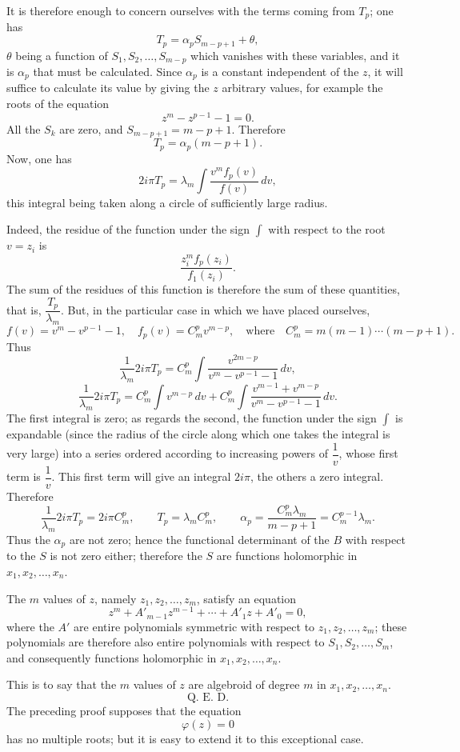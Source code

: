 \documentclass[11pt]{article}
\begin{document}
It is therefore enough to concern ourselves with the terms coming from $T_p$; one has
\[
T_p=\alpha_p S_{m-p+1}+\theta,
\]
$\theta$ being a function of $S_1,S_2,\ldots,S_{m-p}$ which vanishes with these variables, and it is $\alpha_p$ that must be calculated. Since $\alpha_p$ is a constant independent of the $z$, it will suffice to calculate its value by giving the $z$ arbitrary values, for example the roots of the equation
\[
z^m-z^{p-1}-1=0.
\]
All the $S_k$ are zero, and $S_{m-p+1}=m-p+1$. Therefore
\[
T_p=\alpha_p(m-p+1).
\]
Now, one has
\[
2i\pi T_p=\lambda_m\int \frac{v^m f_p(v)}{f(v)}\,dv,
\]
this integral being taken along a circle of sufficiently large radius.

Indeed, the residue of the function under the sign $\int$ with respect to the root $v=z_i$ is
\[
\frac{z_i^m f_p(z_i)}{f_1(z_i)}.
\]
The sum of the residues of this function is therefore the sum of these quantities, that is, $\dfrac{T_p}{\lambda_m}$. But, in the particular case in which we have placed ourselves,
\[
f(v)=v^m-v^{p-1}-1,
\quad
f_p(v)=C_m^p v^{m-p},
\quad \text{where}\quad C_m^p=m(m-1)\cdots(m-p+1).
\]
Thus
\[
\frac{1}{\lambda_m}2i\pi T_p=C_m^p\int \frac{v^{2m-p}}{v^m-v^{p-1}-1}\,dv,
\]
\[
\frac{1}{\lambda_m}2i\pi T_p=C_m^p\int v^{m-p}\,dv+C_m^p\int \frac{v^{m-1}+v^{m-p}}{v^m-v^{p-1}-1}\,dv.
\]
The first integral is zero; as regards the second, the function under the sign $\int$ is expandable (since the radius of the circle along which one takes the integral is very large) into a series ordered according to increasing powers of $\dfrac1v$, whose first term is $\dfrac1v$. This first term will give an integral $2i\pi$, the others a zero integral. Therefore
\[
\frac{1}{\lambda_m}2i\pi T_p=2i\pi C_m^p,
\qquad
T_p=\lambda_m C_m^p,
\qquad
\alpha_p=\frac{C_m^p\lambda_m}{m-p+1}=C_m^{p-1}\lambda_m.
\]
Thus the $\alpha_p$ are not zero; hence the functional determinant of the $B$ with respect to the $S$ is not zero either; therefore the $S$ are functions holomorphic in $x_1,x_2,\ldots,x_n$.

The $m$ values of $z$, namely $z_1,z_2,\ldots,z_m$, satisfy an equation
\[
z^m+A'_{m-1}z^{m-1}+\cdots+A'_1z+A'_0=0,
\]
where the $A'$ are entire polynomials symmetric with respect to $z_1,z_2,\ldots,z_m$; these polynomials are therefore also entire polynomials with respect to $S_1,S_2,\ldots,S_m$, and consequently functions holomorphic in $x_1,x_2,\ldots,x_n$.

This is to say that the $m$ values of $z$ are algebroid of degree $m$ in $x_1,x_2,\ldots,x_n$.
\[
\text{Q. E. D.}
\]
The preceding proof supposes that the equation
\[
\varphi(z)=0
\]
has no multiple roots; but it is easy to extend it to this exceptional case.
\end{document}
